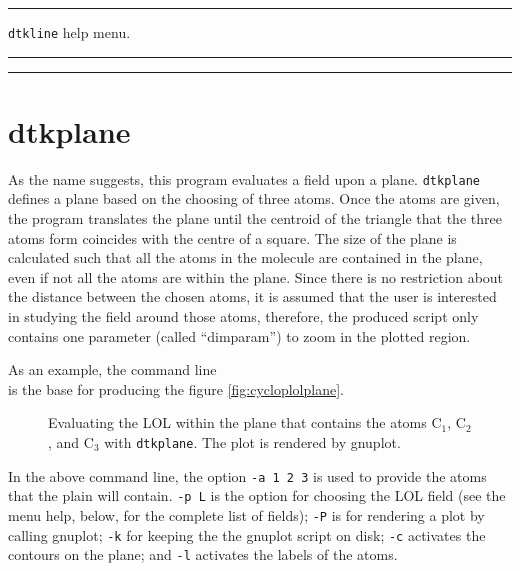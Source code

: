 \rule{\textwidth}{1pt}
{\center\texttt{dtkline} help menu.\\}
\rule{\textwidth}{1pt}
\begin{footnotesize}
\end{footnotesize}
\rule{\textwidth}{1pt}

\section{dtkplane}

As the name suggests, this program evaluates a field upon a plane. \texttt{dtkplane} defines
a plane based on the choosing of three atoms. Once the atoms are given, the program translates the plane until the centroid of the triangle that the three atoms form coincides with the centre of a square. The size of the plane is calculated such that all the atoms in the molecule are contained in the plane, even if not all the atoms are within the plane. Since there is no restriction about the distance between the chosen atoms, it is assumed that the user is interested in studying the field around those atoms, therefore, the produced script only contains one parameter (called ``dimparam'') to zoom in the plotted region.

As an example, the command line\\
is the base for producing the figure \ref{fig:cycloplolplane}. 
%
\begin{figure}[h!]
\centering
{}\qquad\qquad%
\caption{Evaluating the LOL within the plane that contains the atoms C$_1$, C$_2$, and C$_3$ with \texttt{dtkplane}. The plot is rendered by gnuplot.}\label{fig:dtkplaneuseex}
\end{figure}
%

In the above command line, the option \texttt{-a 1 2 3} is used to provide the atoms that the plain will contain. \texttt{-p L} is the option for choosing the LOL field (see the menu help, below, for the complete list of fields); \texttt{-P} is for rendering a plot by calling gnuplot; \texttt{-k} for keeping the the gnuplot script on disk; \texttt{-c} activates the contours on the plane; and \texttt{-l} activates the labels of the atoms.

